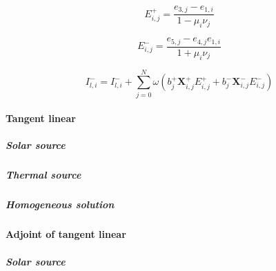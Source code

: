 \begin{equation}
E^{+}_{i,j} = \frac{e_{3,j} -        e_{1,i}}{1 - \mu_{i}\nu_{j}}
\label{eq:source_function_integration-local_source_classical-upward-forward-homogeneous_solution-E_p}
\end{equation}

\begin{equation}
E^{-}_{i,j} = \frac{e_{5,j} - e_{4,j}e_{1,i}}{1 + \mu_{i}\nu_{j}}
\label{eq:source_function_integration-local_source_classical-upward-forward-homogeneous_solution-E_m}
\end{equation}

\begin{equation}
I^{-}_{l,i} = I^{-}_{l,i} + \sum^{N}_{j = 0} \omega (b^{+}_{j}\mathbf{X}^{+}_{i,j}E^{+}_{i,j} + b^{-}_{j}\mathbf{X}^{-}_{i,j}E^{-}_{i,j})
\label{eq:source_function_integration-local_source_classical-upward-forward-homogeneous_solution-I_p_l_i_2}
\end{equation}


%
\paragraph{Tangent linear}
\label{sec:source_function_integration-local_source_classical-downward-tangent_linear}

\subparagraph{Solar source}
\label{sec:source_function_integration-local_source_classical-downward-tanget_linear-solar_source}

\subparagraph{Thermal source}
\label{sec:source_function_integration-local_source_classical-downward-tanget_linear-thermal_source}

\subparagraph{Homogeneous solution}
\label{sec:source_function_integration-local_source_classical-downward-tanget_linear-homogeneous_solution}



%
\paragraph{Adjoint of tangent linear}
\label{sec:source_function_integration-local_source_classical-downward-adjoint_of_tangent_linear}

\subparagraph{Solar source}
\label{sec:source_function_integration-local_source_classical-downward-adjoint_of_tanget_linear-solar_source}

